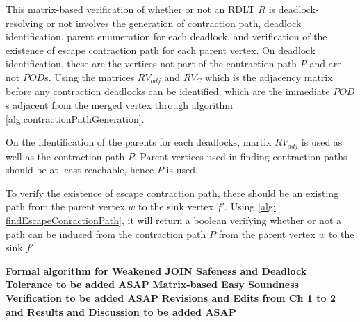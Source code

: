 This matrix-based verification of whether or not an RDLT $R$ is deadlock-resolving or not involves the generation of contraction path, deadlock identification, parent enumeration for each deadlock, and verification of the existence of escape contraction path for each parent vertex. On deadlock identification, these are the vertices not part of the contraction path $P$ and are not $POD$s. Using the matrices $RV_{adj}$ and $RV_{C}$ which is the adjacency matrix before any contraction deadlocks can be identified, which are the immediate $POD$s adjacent from the merged vertex through algorithm \ref{alg:contractionPathGeneration}.

On the identification of the parents for each deadlocks, martix $RV_{adj}$ is used as well as the contraction path $P$. Parent vertices used in finding contraction paths should be at least reachable, hence $P$ is used. 

To verify the existence of escape contraction path, there should be an existing path from the parent vertex $w$ to the sink vertex $f'$. Using \ref{alg: findEscapeConractionPath}, it will return a boolean verifying whether or not a path can be induced from the contraction path $P$ from the parent vertex $w$ to the sink $f'$. 


\textbf{Formal algorithm for Weakened JOIN Safeness and Deadlock Tolerance to be added ASAP}
\textbf{Matrix-based Easy Soundness Verification to be added ASAP}
\textbf{Revisions and Edits from Ch 1 to 2 and Results and Discussion to be added ASAP}



\begin{comment}
    What should I include in this part?
    Include the contraction algorithm by Joenne. And the subsequent matrices that I should be defining. 
    - Adjacency Matrix
    - Constraints Matrix
    - Modified Contraction Paths Generation Algorithm 
    TODO: Include in Related Literature necessary defintions in Weak and Easy Sound Verification such as Deadlock-resolving and escape contraction path. 
    TODO: Include definition of PODs
    TODO: Update the definitions in Ramirez RRL
    
\end{comment}

